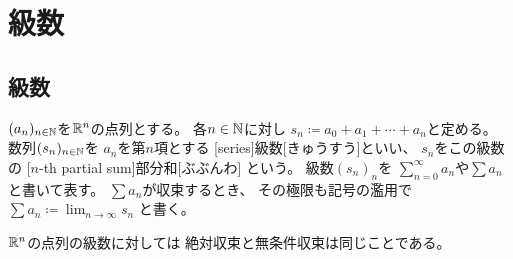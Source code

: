 \documentclass[report]{jlreq}
\begin{document}
%
\chapter{級数}

%
\section{級数}

\begin{definition}[級数]
    $(a_n)_{n \in \mathbb{N}}$を$\mathbb{R}^n$の点列とする。
    各$n \in \mathbb{N}$に対し
    $s_n \coloneqq a_0 + a_1 + \cdots + a_n$と定める。
    数列$(s_n)_{n \in \mathbb{N}}$を
    $a_n$を第$n$項とする
    [series]{級数}[きゅうすう]といい、
    $s_n$をこの級数の
    [$n$-th partial sum]{部分和}[ぶぶんわ]
    という。
    級数$(s_n)_n$を
    $\sum_{n = 0}^\infty a_n$や$\sum a_n$と書いて表す。
    $\sum a_n$が収束するとき、
    その極限も記号の濫用で
    $\sum a_n \coloneqq \lim_{n \to \infty} s_n$
    と書く。
\end{definition}

\begin{proposition}[級数の三角不等式]
    \TODO{}
\end{proposition}

\begin{definition}[並べ替え]
    \TODO{}
\end{definition}

\begin{definition}[絶対収束]
    \TODO{}
\end{definition}

\begin{definition}[無条件収束]
    \TODO{}
\end{definition}

$\mathbb{R}^n$の点列の級数に対しては
絶対収束と無条件収束は同じことである。

\end{document}
